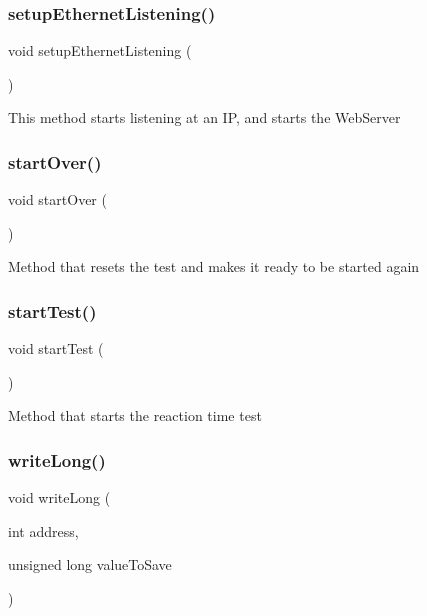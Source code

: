 \subsubsection{\texorpdfstring{setupEthernetListening()}{setupEthernetListening()}}
{\footnotesize\ttfamily void setup\+Ethernet\+Listening (\begin{DoxyParamCaption}{ }\end{DoxyParamCaption})}

This method starts listening at an IP, and starts the Web\+Server \mbox{\label{test_8ino_a56253a1424a135b174dcc12716a79d75}} 
\subsubsection{\texorpdfstring{startOver()}{startOver()}}
{\footnotesize\ttfamily void start\+Over (\begin{DoxyParamCaption}{ }\end{DoxyParamCaption})}

Method that resets the test and makes it ready to be started again \mbox{\label{test_8ino_a347505306ad1e528ecf6b6f19866b5a5}} 
\subsubsection{\texorpdfstring{startTest()}{startTest()}}
{\footnotesize\ttfamily void start\+Test (\begin{DoxyParamCaption}{ }\end{DoxyParamCaption})}

Method that starts the reaction time test \mbox{\label{test_8ino_a5b02fbb87448a058cc6f3d4a1158afc2}} 
\subsubsection{\texorpdfstring{writeLong()}{writeLong()}}
{\footnotesize\ttfamily void write\+Long (\begin{DoxyParamCaption}\item[{int}]{address,  }\item[{unsigned long}]{value\+To\+Save }\end{DoxyParamCaption})}

